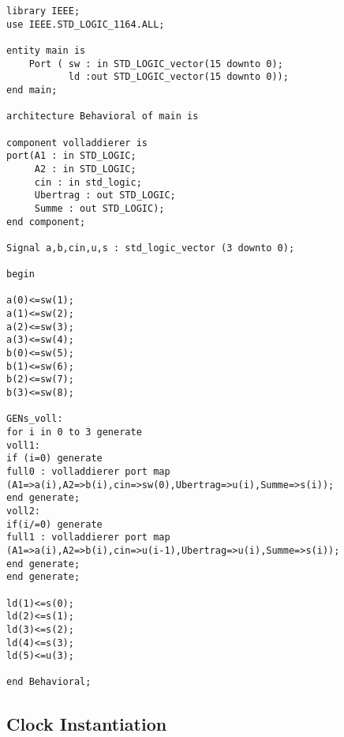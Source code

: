 \documentclass{article}
\begin{document}
\begin{verbatim}
library IEEE;
use IEEE.STD_LOGIC_1164.ALL;

entity main is
    Port ( sw : in STD_LOGIC_vector(15 downto 0);
           ld :out STD_LOGIC_vector(15 downto 0));
end main;

architecture Behavioral of main is

component volladdierer is
port(A1 : in STD_LOGIC;
     A2 : in STD_LOGIC;
     cin : in std_logic;
     Ubertrag : out STD_LOGIC;
     Summe : out STD_LOGIC);
end component;

Signal a,b,cin,u,s : std_logic_vector (3 downto 0);

begin

a(0)<=sw(1);
a(1)<=sw(2);
a(2)<=sw(3);
a(3)<=sw(4);
b(0)<=sw(5);
b(1)<=sw(6);
b(2)<=sw(7);
b(3)<=sw(8);

GENs_voll:
for i in 0 to 3 generate
voll1:
if (i=0) generate
full0 : volladdierer port map
(A1=>a(i),A2=>b(i),cin=>sw(0),Ubertrag=>u(i),Summe=>s(i));
end generate;
voll2:
if(i/=0) generate
full1 : volladdierer port map
(A1=>a(i),A2=>b(i),cin=>u(i-1),Ubertrag=>u(i),Summe=>s(i));
end generate;
end generate;

ld(1)<=s(0);
ld(2)<=s(1);
ld(3)<=s(2);
ld(4)<=s(3);
ld(5)<=u(3);

end Behavioral;
\end{verbatim}

\subsection{Clock Instantiation}
\end{document}
